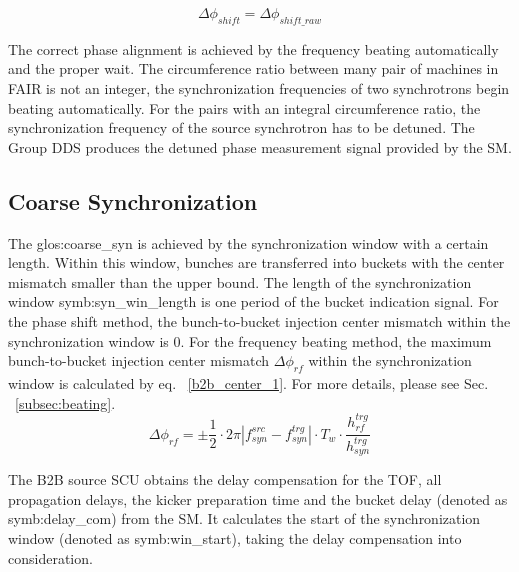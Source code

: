 \begin{equation}
\Delta \phi_\mathit{shift}=\Delta \phi_\mathit{shift\_raw} 
\end{equation}

The correct phase alignment is achieved by the frequency beating automatically and the proper wait. The circumference ratio between many pair of machines in FAIR is not an integer, the synchronization frequencies of two synchrotrons begin beating automatically. For the pairs with an integral circumference ratio, the synchronization frequency of the source synchrotron has to be detuned. The Group DDS produces the detuned phase measurement signal provided by the SM. 



\subsection{Coarse Synchronization}

The \gls{glos:coarse_syn} is achieved by the synchronization window with a certain length. Within this window, bunches are transferred into buckets with the center mismatch smaller than the upper bound. The length of the synchronization window \gls{symb:syn_win_length} is one period of the bucket indication signal. For the phase shift method, the bunch-to-bucket injection center mismatch within the synchronization window is $0$. For the frequency beating method, the maximum bunch-to-bucket injection center mismatch $\Delta \phi_\mathit{rf}$ within the synchronization window is calculated by eq. ~\ref{b2b_center_1}. For more details, please see Sec. ~\ref{subsec:beating}.
\begin{equation}
\Delta \phi_\mathit{rf}=\pm \frac{1}{2}\cdot 2\pi|f_{\mathit{syn}}^\mathit{src}-f_{\mathit{syn}}^\mathit{trg}|\cdot T_\mathit{w} \cdot \frac{h_{\mathit{rf}}^\mathit{trg}}{h_{\mathit{syn}}^\mathit{trg}}
\label{b2b_center_1}
\end{equation}

The B2B source SCU obtains the delay compensation for the TOF, all propagation delays, the kicker preparation time and the bucket delay (denoted as \gls{symb:delay_com}) from the SM. It calculates the start of the synchronization window (denoted as \gls{symb:win_start}), taking the delay compensation into consideration. 

